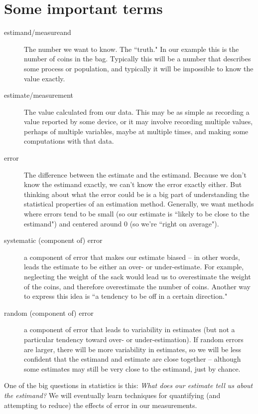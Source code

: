 \documentclass[twoside]{book}\usepackage[]{graphicx}\usepackage[]{xcolor}
\newcounter{example}[section]
\begin{document}
\section*{Some important terms}

\begin{description}
	\item[estimand/measureand]{ The number we want to know.  The ``truth." 
    In our example this is the number
		of coins in the bag.  Typically this will be a number that describes some process
		or population, and typically it will be impossible to know the value exactly.}

	\item[estimate/measurement]{The value calculated from our data.  This may be 
		as simple as recording a value reported by some device, or it may involve
		recording multiple values, perhaps of multiple variables, maybe at multiple times,
    and making some computations with that data.}  

	\item[error]{The difference between the estimate and the estimand.  Because we don't
		know the estimand exactly, we can't know the error exactly either.  But thinking
		about what the error could be is a big part of understanding the statistical
		properties of an estimation method.  Generally, we want methods where errors 
		tend to be small (so our estimate is ``likely to be close to the estimand")
		and centered around 0 (so we're ``right on average").}
	\item
		[systematic (component of) error]{a component of error that makes our estimate
    biased -- in other words, leads the estimate to be either an over- or under-estimate.
    For example, neglecting the weight of the sack would
		lead us to overestimate the weight of the coins, and therefore overestimate 
		the number of coins.  Another way to express this idea is ``a tendency to be off in
		a certain direction."}
	\item
		[random (component of) error]{a component of error that leads to variability
		in estimates (but not a particular tendency toward over- or under-estimation).
    If random errors are larger, there will be more variability 
		in estimates, so we will be less confident that the estimand and estimate are 
		close together -- although some estimates may still be very close to the estimand,
    just by chance.}
\end{description}

One of the big questions in statistics is this:  
\emph{What does our estimate tell us about the estimand?}
We will eventually learn techniques for quantifying (and attempting to reduce)
the effects of error in our measurements. 
\end{document}
